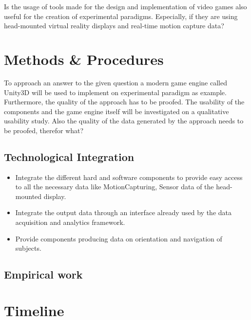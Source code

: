 \documentclass[	DIV=calc, paper=a4,	fontsize=11pt, twocolumn]{scrartcl}
\begin{document}
Is the usage of tools made for the design and implementation of video games also useful for the creation of experimental paradigms. Especially, if they are using head-mounted virtual reality displays and real-time motion capture data? 

\section*{Methods \& Procedures}

To approach an answer to the given question a modern game engine called Unity3D will be used to implement on experimental paradigm as example. Furthermore, the quality of the approach has to be proofed.  
The usability of the components and the game engine itself will be investigated on a qualitative usability study. Also the quality of the data generated by the approach needs to be proofed, therefor what?

\subsection*{Technological Integration}
 
\begin{itemize}
\item Integrate the different hard and software components to provide easy access to all the necessary data like MotionCapturing, Sensor data of the head-mounted display. 
\item Integrate the output data through an interface already used by the data acquisition and analytics framework.
\item Provide components producing data on orientation and navigation of subjects.
\end{itemize}

\subsection*{Empirical work}



\section*{Timeline}



\end{document}
